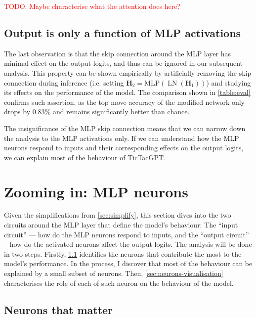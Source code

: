 \documentclass{article}
\newcommand{\todo}[1]{\textcolor{red}{TODO: #1}}
\newcommand{\ttgpt}{TicTacGPT\xspace}
\newcommand{\m}[1]{\mathbf{\bm{#1}}}
\DeclareMathOperator{\layernorm}{LN}
\begin{document}
\todo{Maybe characterise what the attention does here?}

\subsection{Output is only a function of MLP activations} \label{sec:simplify-output}

The last observation is that the skip connection around the MLP layer has minimal effect on the output logits, and thus can be ignored in our subsequent analysis. This property can be shown empirically by artificially removing the skip connection during inference (i.e. setting $\m{H}_2 = \text{MLP}(\layernorm(\m{H}_1))$) and studying its effects on the performance of the model. The comparison shown in \cref{table:eval} confirms such assertion, as the top move accuracy of the modified network only drops by $0.83\%$ and remains significantly better than chance.

The insignificance of the MLP skip connection means that we can narrow down the analysis to the MLP activations only. If we can understand how the MLP neurons respond to inputs and their corresponding effects on the output logits, we can explain most of the behaviour of \ttgpt.

\section{Zooming in: MLP neurons}

Given the simplifications from \cref{sec:simplify}, this section dives into the two circuits around the MLP layer that define the model's behaviour: The ``input circuit'' --- how do the MLP neurons respond to inputs, and the ``output circuit'' -- how do the activated neurons affect the output logits. The analysis will be done in two steps. Firstly, \cref{sec:neurons-that-matter} identifies the neurons that contribute the most to the model's performance. In the process, I discover that most of the behaviour can be explained by a small subset of neurons. Then, \cref{sec:neurons-visualisation} characterises the role of each of such neuron on the behaviour of the model.

\subsection{Neurons that matter} \label{sec:neurons-that-matter}


\end{document}
